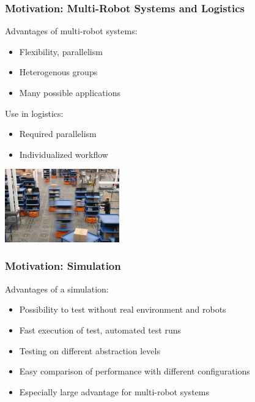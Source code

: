 \documentclass[]{beamer}
\begin{document}
\begin{frame}
  \frametitle{Motivation: Multi-Robot Systems and Logistics}
  \begin{multicols}{2}
  Advantages of multi-robot systems:
  \begin{itemize}
  \item Flexibility, parallelism
  \item Heterogenous groups %
  \item Many possible applications %
  \end{itemize}
  Use in logistics:
  \begin{itemize}
  \item Required parallelism
  \item Individualized workflow
  \end{itemize}
  \includegraphics[width=140pt]{../pics/kiva.jpg}
  \end{multicols}
\end{frame}

\begin{frame}
  \frametitle{Motivation: Simulation}
  Advantages of a simulation:
  \begin{itemize}
  \item Possibility to test without real environment and robots
  \item Fast execution of test, automated test runs
  \item Testing on different abstraction levels
  \item Easy comparison of performance with different configurations 
  \item Especially large advantage for multi-robot systems
  \end{itemize}
\end{frame}
\end{document}
